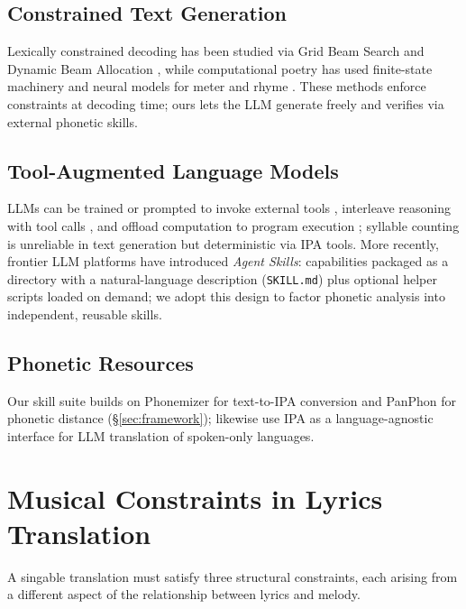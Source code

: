 \documentclass[11pt]{article}
\begin{document}
\subsection{Constrained Text Generation}

Lexically constrained decoding has been studied via Grid Beam Search and Dynamic Beam Allocation \citep{hokamp-liu-2017-lexically,post-vilar-2018-fast}, while computational poetry has used finite-state machinery and neural models for meter and rhyme \citep{ghazvininejad-etal-2016-generating,hopkins-kiela-2017-automatically,lau-etal-2018-deep}.
These methods enforce constraints at decoding time; ours lets the LLM generate freely and verifies via external phonetic skills.

\subsection{Tool-Augmented Language Models}

LLMs can be trained or prompted to invoke external tools \citep{schick-etal-2023-toolformer}, interleave reasoning with tool calls \citep{yao-etal-2023-react}, and offload computation to program execution \citep{gao-etal-2023-pal}; syllable counting is unreliable in text generation but deterministic via IPA tools.
More recently, frontier LLM platforms have introduced \emph{Agent Skills}: capabilities packaged as a directory with a natural-language description (\texttt{SKILL.md}) plus optional helper scripts loaded on demand; we adopt this design to factor phonetic analysis into independent, reusable skills.

\subsection{Phonetic Resources}

Our skill suite builds on Phonemizer \citep{bernard-titeux-2021-phonemizer} for text-to-IPA conversion and PanPhon \citep{mortensen-etal-2016-panphon} for phonetic distance (\S\ref{sec:framework}); \citet{chen-etal-2025-ipa-translation} likewise use IPA as a language-agnostic interface for LLM translation of spoken-only languages.

\section{Musical Constraints in Lyrics Translation}
\label{sec:constraints}

A singable translation must satisfy three structural constraints, each arising from a different aspect of the relationship between lyrics and melody.
\end{document}
